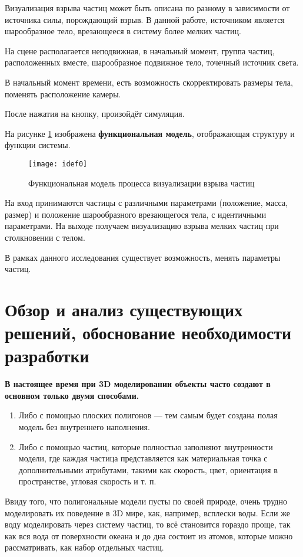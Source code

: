 Визуализация взрыва частиц может быть описана по разному в зависимости от источника силы, порождающий взрыв. В данной работе, источником является шарообразное тело, врезающееся в систему более мелких частиц.
	
На сцене располагается неподвижная, в начальный момент, группа частиц, расположенных вместе, шарообразное подвижное тело, точечный источник света.
	
В начальный момент времени, есть возможность скорректировать размеры тела, поменять расположение камеры.
	
После нажатия на кнопку, произойдёт симуляция.

На рисунке \ref{img:idef0} изображена \textbf{функциональная модель}, отображающая структуру и функции системы. 

\begin{figure}[H]
	\centering
	\texttt{[image: idef0]}
	\caption{Функциональная модель процесса визуализации взрыва частиц}
	\label{img:idef0}
\end{figure}

На вход принимаются частицы с различными параметрами (положение, масса, размер) и положение шарообразного врезающегося тела, с идентичными параметрами. На выходе получаем визуализацию взрыва мелких частиц при столкновении с телом. 

В рамках данного исследования существует возможность, менять параметры частиц. 

\section{\textbf{Обзор и анализ существующих решений, обоснование необходимости разработки}}

\textbf{В настоящее время при 3D моделировании объекты часто создают в основном только двумя способами.} \cite{3dgraphic}
\begin{enumerate}
	\item Либо с помощью плоских полигонов — тем самым будет создана полая модель без внутреннего наполнения. 
	\item Либо с помощью частиц, которые полностью заполняют внутренности модели, где каждая частица представляется как материальная точка с дополнительными атрибутами, такими как скорость, цвет, ориентация в пространстве, угловая скорость и т. п.
\end{enumerate}

Ввиду того, что полигональные модели пусты по своей природе, очень трудно моделировать их поведение в 3D мире, как, например, всплески воды. Если же воду моделировать через систему частиц, то всё становится гораздо проще, так как вся вода от поверхности океана и до дна состоит из атомов, которые можно рассматривать, как набор отдельных частиц.

